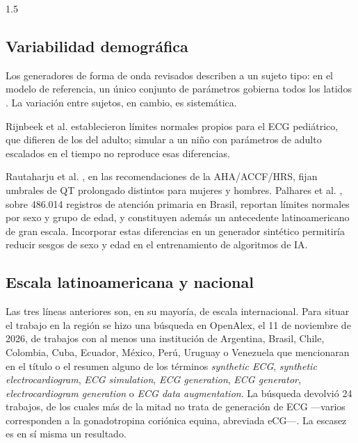 \begin{spacing}{1.5}
\subsection{Variabilidad demográfica}

Los generadores de forma de onda revisados describen a un sujeto tipo: en el modelo de referencia, un único conjunto de parámetros gobierna todos los latidos \cite{mcsharry2003dynamical}. La variación entre sujetos, en cambio, es sistemática.

Rijnbeek et al. \cite{rijnbeek2001normal} establecieron límites normales propios para el ECG pediátrico, que difieren de los del adulto; simular a un niño con parámetros de adulto escalados en el tiempo no reproduce esas diferencias.

Rautaharju et al. \cite{rautaharju2009aha}, en las recomendaciones de la AHA/ACCF/HRS, fijan umbrales de QT prolongado distintos para mujeres y hombres. Palhares et al. \cite{palhares2017normal}, sobre 486.014 registros de atención primaria en Brasil, reportan límites normales por sexo y grupo de edad, y constituyen además un antecedente latinoamericano de gran escala. Incorporar estas diferencias en un generador sintético permitiría reducir sesgos de sexo y edad en el entrenamiento de algoritmos de IA.

\subsection{Escala latinoamericana y nacional}

Las tres líneas anteriores son, en su mayoría, de escala internacional. Para situar el trabajo en la región se hizo una búsqueda en OpenAlex, el 11 de noviembre de 2026, de trabajos con al menos una institución de Argentina, Brasil, Chile, Colombia, Cuba, Ecuador, México, Perú, Uruguay o Venezuela que mencionaran en el título o el resumen alguno de los términos \emph{synthetic ECG}, \emph{synthetic electrocardiogram}, \emph{ECG simulation}, \emph{ECG generation}, \emph{ECG generator}, \emph{electrocardiogram generation} o \emph{ECG data augmentation}. La búsqueda devolvió 24 trabajos, de los cuales más de la mitad no trata de generación de ECG ---varios corresponden a la gonadotropina coriónica equina, abreviada eCG---. La escasez es en sí misma un resultado.


\end{spacing}
